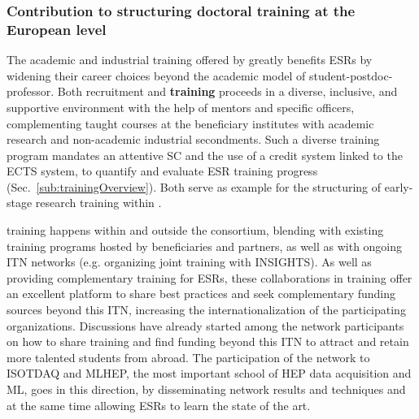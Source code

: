 
\subsubsection{Contribution to structuring doctoral training at the European level}


The academic and industrial training offered by \acronym greatly benefits ESRs by widening their career choices beyond the academic model of student-postdoc-professor.
Both \acronym recruitment and \textbf{training} proceeds in a diverse, inclusive, and supportive environment with the help of mentors and specific officers, complementing
taught courses at the beneficiary institutes with academic research and non-academic industrial secondments. 
Such a diverse training program mandates an attentive SC and the use of a credit system linked to the ECTS system, to quantify and evaluate ESR training progress (Sec.~\ref{sub:trainingOverview}). 
Both serve as example for the structuring of early-stage research training within \acronym. 

\acronym training happens within and outside the consortium, blending with existing training programs hosted by beneficiaries and partners, as well as with ongoing ITN networks (e.g. organizing joint training with INSIGHTS).
As well as providing complementary training for ESRs, these collaborations in training offer an excellent platform to share best practices and seek complementary funding sources beyond this ITN, increasing the internationalization of the participating organizations. 
Discussions have already started among the network participants on how to share training and find funding beyond this ITN to attract and retain more talented students from abroad. The participation of the network to ISOTDAQ and MLHEP, the most important school of HEP data acquisition and ML, goes in this direction, by disseminating network results and techniques and at the same time allowing ESRs to learn the state of the art. 


